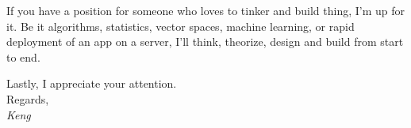 \documentclass{resume} %
\begin{document}
If you have a position for someone who loves to tinker and build thing, I'm up for it. Be it algorithms, statistics, vector spaces, machine learning, or rapid deployment of an app on a server, I'll think, theorize, design and build from start to end.

Lastly, I appreciate your attention.\\


Regards,\\
{\em Keng}










% 
% 
\end{document}
